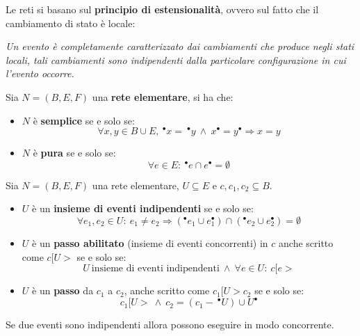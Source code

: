 Le reti si basano sul \textbf{principio di estensionalità}, ovvero sul fatto che
il cambiamento di stato è locale:
\begin{center}
    \textit{Un evento è completamente caratterizzato dai cambiamenti che produce
        negli stati locali, tali cambiamenti sono indipendenti dalla particolare
        configurazione in cui l'evento occorre.}
\end{center}
\begin{definizione}[]
    Sia $N = (B, E, F)$ una \textbf{rete elementare}, si ha che:
    \begin{itemize}
        \item $N$ è \textbf{semplice} se e solo se:
              \begin{equation}
                  \forall x, y \in B \cup E, \ ^{\bullet} x = \ ^{\bullet} y \
                  \land \ x^{\bullet} = y^{\bullet} \Rightarrow x = y
              \end{equation}
        \item $N$ è \textbf{pura} se e solo se:
              \begin{equation}
                  \forall e \in E: \ ^{\bullet}e \cap e^{\bullet} = \emptyset
              \end{equation}
    \end{itemize}
\end{definizione}
\begin{definizione}
    Sia $N = (B, E, F)$ una rete elementare, $U \subseteq E$ e $c, c_1, c_2 \subseteq B$.
    \begin{itemize}
        \item $U$ è un \textbf{insieme di eventi indipendenti} se e solo se:
              \begin{equation}
                  \forall e_1, e_2 \in U: \ e_1 \neq e_2 \Rightarrow (^{\bullet}e_1
                  \cup e_1^{\bullet}) \cap (^{\bullet}e_2 \cup e_2^{\bullet}) = \emptyset
              \end{equation}
        \item $U$ è un \textbf{passo abilitato} (insieme di eventi concorrenti)
              in $c$ anche scritto come $c[U >$ se e solo se:
              \begin{equation}
                  U \ \text{insieme di eventi indipendenti} \ \land \ \forall e
                  \in U: \ c[e >
              \end{equation}
        \item $U$ è un \textbf{passo} da $c_1$ a $c_2$, anche scritto come
              $c_1[U > c_2$ se e solo se:
              \begin{equation}
                  c_1 [ U > \ \land \ c_2 = (c_1 - \ ^{\bullet} U) \cup U^{\bullet}
              \end{equation}
    \end{itemize}
    Se due eventi sono indipendenti allora possono eseguire in modo concorrente.
\end{definizione}
